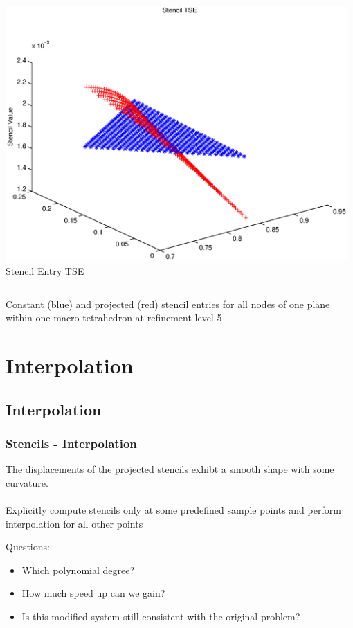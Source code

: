 \documentclass[t,compress=false,usepdftitle=false]{beamer}
\begin{document}
\begin{frame}
\begin{columns}[T]
\begin{column}[T]{4.1cm}
  \includegraphics[width=0.98\textwidth]{stencilTSE_nE}\\
  Stencil Entry TSE
\end{column}
\end{columns}
\vspace{0.5cm}
\centering
Constant (blue) and projected (red) stencil entries for all nodes of one plane
within one macro tetrahedron at refinement level 5
\end{frame}

%
\section{Interpolation}
\subsection{Interpolation}
%
%
\begin{frame}\frametitle{Stencils - Interpolation}


 The displacements of the projected stencils exhibt
a smooth shape with some curvature.\\
\vspace{4ex}
\\
\vspace{4ex} 
 Explicitly compute stencils only at some predefined sample
points and perform interpolation for all other points 

Questions: 
\begin{itemize}
\item{Which polynomial degree?}
\item{How much speed up can we gain?}
\item{Is this modified system still consistent with the original problem? }
\end{itemize}



\end{frame}
\end{document}
